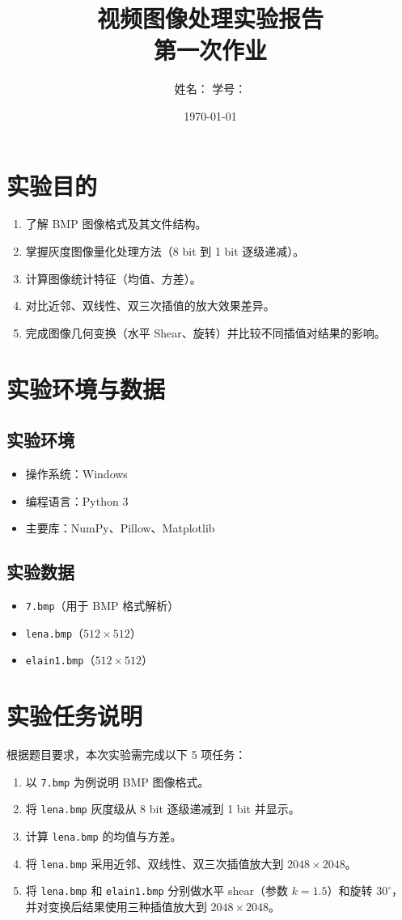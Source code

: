 \documentclass[UTF8,a4paper,12pt]{ctexart}
\title{视频图像处理实验报告\\第一次作业}
\author{姓名：\underline{\hspace{3cm}} \quad 学号：\underline{\hspace{3cm}}}
\date{\today}
\begin{document}
\maketitle
\tableofcontents
\newpage

\section{实验目的}
\begin{enumerate}
  \item 了解 BMP 图像格式及其文件结构。
  \item 掌握灰度图像量化处理方法（8 bit 到 1 bit 逐级递减）。
  \item 计算图像统计特征（均值、方差）。
  \item 对比近邻、双线性、双三次插值的放大效果差异。
  \item 完成图像几何变换（水平 Shear、旋转）并比较不同插值对结果的影响。
\end{enumerate}

\section{实验环境与数据}
\subsection{实验环境}
\begin{itemize}
  \item 操作系统：Windows
  \item 编程语言：Python 3
  \item 主要库：NumPy、Pillow、Matplotlib
\end{itemize}

\subsection{实验数据}
\begin{itemize}
  \item \texttt{7.bmp}（用于 BMP 格式解析）
  \item \texttt{lena.bmp}（$512\times512$）
  \item \texttt{elain1.bmp}（$512\times512$）
\end{itemize}

\section{实验任务说明}
根据题目要求，本次实验需完成以下 5 项任务：
\begin{enumerate}
  \item 以 \texttt{7.bmp} 为例说明 BMP 图像格式。
  \item 将 \texttt{lena.bmp} 灰度级从 8 bit 逐级递减到 1 bit 并显示。
  \item 计算 \texttt{lena.bmp} 的均值与方差。
  \item 将 \texttt{lena.bmp} 采用近邻、双线性、双三次插值放大到 $2048\times2048$。
  \item 将 \texttt{lena.bmp} 和 \texttt{elain1.bmp} 分别做水平 shear（参数 $k=1.5$）和旋转 $30^\circ$，并对变换后结果使用三种插值放大到 $2048\times2048$。
\end{enumerate}
\end{document}
